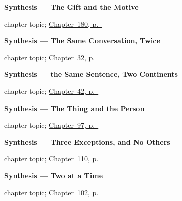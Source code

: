 \noindent\begin{minipage}[t]{\linewidth}
\raggedright
\textbf{Synthesis --- The Gift and the Motive}\par
\footnotesize chapter topic; \hyperref[ch:synthesis-por-para]{Chapter~180, p.~\pageref*{ch:synthesis-por-para}}
\end{minipage}\par\smallskip

\noindent\begin{minipage}[t]{\linewidth}
\raggedright
\textbf{Synthesis --- The Same Conversation, Twice}\par
\footnotesize chapter topic; \hyperref[ch:synthesis-ar-singular]{Chapter~32, p.~\pageref*{ch:synthesis-ar-singular}}
\end{minipage}\par\smallskip

\noindent\begin{minipage}[t]{\linewidth}
\raggedright
\textbf{Synthesis --- the Same Sentence, Two Continents}\par
\footnotesize chapter topic; \hyperref[ch:spanish-synthesis-plural-you]{Chapter~42, p.~\pageref*{ch:spanish-synthesis-plural-you}}
\end{minipage}\par\smallskip

\noindent\begin{minipage}[t]{\linewidth}
\raggedright
\textbf{Synthesis --- The Thing and the Person}\par
\footnotesize chapter topic; \hyperref[ch:synthesis-two-sets]{Chapter~97, p.~\pageref*{ch:synthesis-two-sets}}
\end{minipage}\par\smallskip

\noindent\begin{minipage}[t]{\linewidth}
\raggedright
\textbf{Synthesis --- Three Exceptions, and No Others}\par
\footnotesize chapter topic; \hyperref[ch:spanish-synthesis-imperfecto]{Chapter~110, p.~\pageref*{ch:spanish-synthesis-imperfecto}}
\end{minipage}\par\smallskip

\noindent\begin{minipage}[t]{\linewidth}
\raggedright
\textbf{Synthesis --- Two at a Time}\par
\footnotesize chapter topic; \hyperref[ch:synthesis-double-object]{Chapter~102, p.~\pageref*{ch:synthesis-double-object}}
\end{minipage}\par\smallskip


